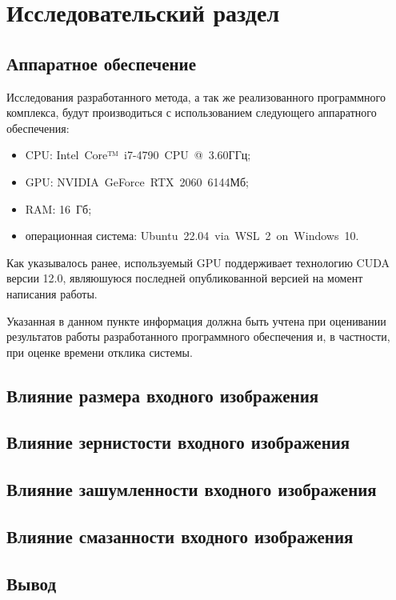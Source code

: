 \chapter{Исследовательский раздел}

\section{Аппаратное обеспечение}

Исследования разработанного метода, а так же реализованного программного комплекса, будут производиться с использованием следующего аппаратного обеспечения:
\begin{itemize}[label=---]
    \item CPU: Intel~Core™~i7-4790~CPU~@~3.60ГГц;
    \item GPU: NVIDIA~GeForce~RTX~2060~6144Мб;
    \item RAM: 16~Гб;
    \item операционная система: Ubuntu~22.04~via~WSL~2~on~Windows~10.
\end{itemize}

Как указывалось ранее, используемый GPU поддерживает технологию CUDA версии 12.0, являюшуюся последней опубликованной версией на момент написания работы.

Указанная в данном пункте информация должна быть учтена при оценивании результатов работы разработанного программного обеспечения и, в частности, при оценке времени отклика системы.

\section{Влияние размера входного изображения}

\section{Влияние зернистости входного изображения}

\section{Влияние зашумленности входного изображения}

\section{Влияние смазанности входного изображения}

\section{Вывод}
